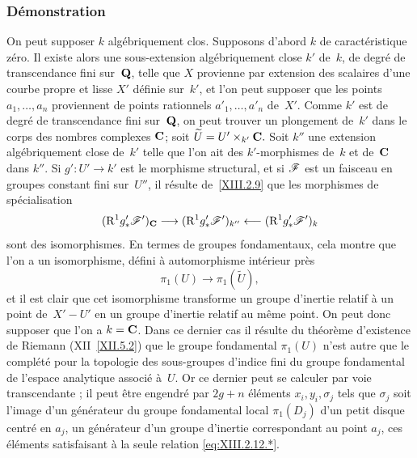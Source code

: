\subsubsection*{D\'emonstration}
On peut supposer $k$ alg\'ebriquement clos. Supposons d'abord $k$ de
carac\-t\'eristique z\'ero. Il existe alors une sous-extension
alg\'ebriquement close $k'$ de~$k$, de degr\'e de transcendance
fini sur~$\mathbf{Q}$, telle que $X$ provienne par extension des scalaires
d'une courbe propre et lisse $X'$ d\'efinie sur~$k'$, et l'on peut
supposer que les points $a_1,\dots,a_n$ proviennent de points rationnels
$a'_1,\dots,a'_n$ de~$X'$. Comme $k'$ est de degr\'e de transcendance
fini sur~$\mathbf{Q}$, on peut trouver un plongement de~$k'$ dans le corps
des nombres complexes $\mathbf{C}$; soit $\widetilde{U}=U'\times_{k'}\mathbf{C}.$
Soit $k''$ une extension alg\'ebriquement close de~$k'$ telle que
l'on ait des $k'$-morphismes de~$k$ et de~$\mathbf{C}$ dans $k''$. Si
$g'\colon U'\to k'$ est le morphisme structural, et si
$\cal{F}$ est un faisceau en groupes constant fini sur~$U''$, il
r\'esulte de~\ref{XIII.2.9} que les morphismes de sp\'ecialisation
$$
(\R^1g'_*\cal{F}')_{\CC}\to(\R^1g'_*\cal{F}')_{k''}
\from(\R^1g'_*\cal{F}')_k
$$
sont des isomorphismes. En termes de groupes fondamentaux, cela montre
que l'on a un isomorphisme, d\'efini \`a automorphisme
int\'erieur pr\`es
$$
\pi_1(U)\to\pi_1(\widetilde{U}),
$$
et il est clair que cet isomorphisme transforme un groupe d'inertie
relatif \`a un point de~$X'-U'$ en un groupe d'inertie relatif au
m\^eme point. On peut donc supposer que l'on a $k=\mathbf{C}$. Dans ce
dernier cas il r\'esulte du th\'eor\`eme d'existence de Riemann
(XII~\ref{XII.5.2}) que le groupe fondamental $\pi_1(U)$ n'est autre
que le compl\'et\'e pour la topologie des sous-groupes d'indice
fini du groupe fondamental de l'espace analytique associ\'e \`a~$U$. Or ce dernier peut se calculer par voie transcendante \cite[ch.\, 7
\S 47]{XIII.3};
il peut \^etre engendr\'e par $2g+n$ \'el\'ements $x_i,
y_i,\sigma_j$ tels que $\sigma_j$ soit l'image d'un g\'en\'erateur
du groupe fondamental local $\pi_1(D_j)$ d'un petit disque centr\'e
en $a_j$, \ie un g\'en\'erateur d'un groupe d'inertie
correspondant au point $a_j$, ces \'el\'ements satisfaisant \`a
la seule relation \eqref{eq:XIII.2.12.*}.

